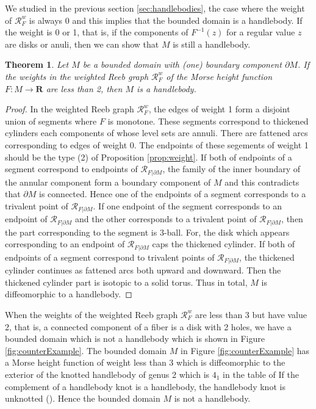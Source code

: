 \documentclass{amsart}
\newtheorem{theorem}{Theorem}[section]
\numberwithin{equation}{section}
\newcommand{\RR}{{\boldsymbol{R}}}
\newcommand{\lra}{\longrightarrow}
\newcommand{\bd}{\partial}
\begin{document}
We studied in the previous section \ref{sec:handlebodies}, the case where the weight of
$\mathcal{R}_F^w$ is always 0 and this implies that the bounded domain is a handlebody. 
If the weight is 0 or 1, that is, if the components of $F^{-1}(z)$ for a regular value $z$ are disks or anuli, then  we can show that $M$ is still a handlebody.

\begin{theorem}\label{th:w<2}
Let $M$ be a bounded domain with (one) boundary component $\bd M$. 
If the weights in the weighted Reeb graph
$\mathcal{R}_{F}^w$ of the Morse height function $F:M\lra \RR$ are less than 2, then $M$ is a handlebody.
\end{theorem}



\begin{proof} %
In the weighted Reeb graph $\mathcal{R}_{F}^w$, the edges of weight 1 form a disjoint union of segments where $F$ is monotone. These segments correspond to thickened cylinders each components of whose level sets are annuli. There are fattened arcs corresponding to edges of weight 0.  The endpoints of these segements of weight 1 should be the type (2) of Proposition \ref{prop:weight}. If both of endpoints of a segment correspond to endpoints of $\mathcal{R}_{F|\bd M}$, the family of the inner boundary of the annular component form a boundary component of $M$ and this contradicts that $\bd M$ is connected. Hence one of the endpoints of a segment corresponds to a trivalent point of $\mathcal{R}_{F|\bd M}$. If one endpoint of the segment corresponds to an endpoint of $\mathcal{R}_{F|\bd M}$ and the other corresponds to a trivalent point of $\mathcal{R}_{F|\bd M}$, then the part corresponding to the segment is 3-ball. For, the disk which appears corresponding to an endpoint of $\mathcal{R}_{F|\bd M}$ caps the thickened cylinder. If both of endpoints of a segment correspond to trivalent points of $\mathcal{R}_{F|\bd M}$, the thickened cylinder continues as fattened arcs both upward and downward. Then the thickened cylinder part is isotopic to a solid torus. Thus in total, $M$ is diffeomorphic to a handlebody. 
\end{proof}


When the weights of the weighted Reeb graph $\mathcal{R}^w_F$ are less than 3 but have value 2, that is, a connected component of a fiber is a disk with 2 holes, we have a bounded domain which is not a handlebody which is shown in Figure \ref{fig:counterExample}. The bounded domain  $M$ in Figure \ref{fig:counterExample} has a Morse height function of weight less than 3 which is diffeomorphic to the exterior of the knotted handlebody of genus 2 which is $4_1$ in the table of \cite{IKMS} If the complement of a handlebody knot is a handlebody, the handlebody knot is unknotted (\cite{Waldhausen}). Hence the bounded domain  $M$ is not a handlebody.
\end{document}
